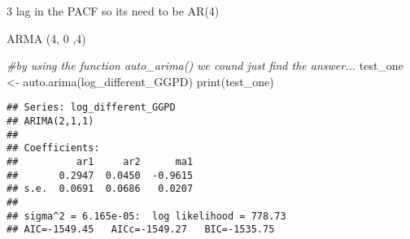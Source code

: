\documentclass[
]{article}
\newenvironment{Shaded}{\begin{snugshade}}{\end{snugshade}}
\newcommand{\CommentTok}[1]{\textcolor[rgb]{0.56,0.35,0.01}{\textit{#1}}}
\newcommand{\FunctionTok}[1]{\textcolor[rgb]{0.00,0.00,0.00}{#1}}
\newcommand{\NormalTok}[1]{#1}
\newcommand{\OtherTok}[1]{\textcolor[rgb]{0.56,0.35,0.01}{#1}}
\begin{document}
3 lag in the PACF so its need to be AR(4)

ARMA (4, 0 ,4)

\begin{Shaded}
\begin{Highlighting}[]
\CommentTok{\#by using the function auto\_arima() we cound just find the answer...}
\NormalTok{test\_one }\OtherTok{\textless{}{-}} \FunctionTok{auto.arima}\NormalTok{(log\_different\_GGPD)}
\FunctionTok{print}\NormalTok{(test\_one)}
\end{Highlighting}
\end{Shaded}

\begin{verbatim}
## Series: log_different_GGPD 
## ARIMA(2,1,1) 
## 
## Coefficients:
##          ar1     ar2      ma1
##       0.2947  0.0450  -0.9615
## s.e.  0.0691  0.0686   0.0207
## 
## sigma^2 = 6.165e-05:  log likelihood = 778.73
## AIC=-1549.45   AICc=-1549.27   BIC=-1535.75
\end{verbatim}
\end{document}
